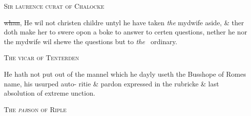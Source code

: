 \documentclass[12pt, a4paper]{book}
\begin{document}
            
               
				\begin{center} \begin{large} {\scshape Sir laurence curat of Chalocke} \end{large} \end{center}
			
            	
			
            		
		\ifthenelse{\isodd{\thepage}}
		{\reversemarginpar}
		{\normalmarginpar}
		\sout{whan}, He wil not christen childre untyl he have
 taken \textit{the} mydwife aside, \& ther doth make her to swere
 opon a boke to answer to certen questions, nether he
 nor the mydwife wil shewe the questions but to \textit{the} 
            		ordinary.
 
	
            
            	
				\begin{center} \begin{large} {\scshape The vicar of Tenterden} \end{large} \end{center}
			
		
			
				\marginpar[\vspace{0.5cm}{\textcolor{Gray}{the Busshope of Rome}}]{}
			
			
		\ifthenelse{\isodd{\thepage}}
		{\reversemarginpar}
		{\normalmarginpar}
		He hath not put out of the mannel which he dayly
		 useth the Busshope of Romes name, his usurped auto-
		 ritie \& pardon expressed in the rubricke \& last absolution
		 of extreme unction.
		
	
            
            	
				\begin{center} \begin{large} {\scshape The \textit{par}son of Riple} \end{large} \end{center}
			

		
			
				\marginpar[\vspace{0.5cm}{\textcolor{Gray}{pater noster in English}}]{}
			
			
				\marginpar[\vspace{0.5cm}{\textcolor{Gray}{n}}]{}
			
\end{document}

